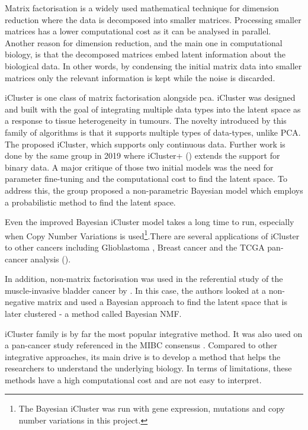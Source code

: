 Matrix factorisation is a widely used mathematical technique for dimension reduction where the data is decomposed into smaller matrices. Processing smaller matrices has a lower computational cost as it can be analysed in parallel. Another reason for dimension reduction, and the main one in computational biology, is that the decomposed matrices embed latent information about the biological data. In other words, by condensing the initial matrix data into smaller matrices only the relevant information is kept while the noise is discarded. 

iCluster \cite{Shen2009-ew, Mo2013-zi, Mo2018-el} is one class of matrix factorisation alongside \acrlong{pca}. iCluster was designed and built with the goal of integrating multiple data types into the latent space as a response to tissue heterogeneity in tumours. The novelty introduced by this family of algorithms is that it supports multiple types of data-types, unlike PCA. The \citet{Shen2009-ew} proposed iCluster, which supports only continuous data. Further work is done by the same group in 2019  where iCluster+ (\citet{Mo2013-zi}) extends the support for binary data. A major critique of those two initial models was the need for parameter fine-tuning and the computational cost to find the latent space. To address this, the group proposed a non-parametric Bayesian model \citet{Mo2018-el} which employs a probabilistic method to find the latent space. 

Even the improved Bayesian iCluster model takes a long time to run, especially when Copy Number Variations is used\footnote{The Bayesian iCluster was run with gene expression, mutations and copy number variations in this project.}.There are several applications of iCluster to other cancers including Glioblastoma \cite{Shen2012-yj},  Breast cancer \citet{Curtis2012-ff} and the TCGA pan-cancer analysis (\citet{Hoadley2018-qe}).

In addition, non-matrix factorisation was used in the referential study of the muscle-invasive bladder cancer by \citet{Robertson2017-mg}. In this case, the authors looked at a non-negative matrix and used a Bayesian approach to find the latent space that is later clustered - a method called Bayesian NMF.

iCluster family is by far the most popular integrative method. It was also used on a pan-cancer \cite{Hoadley2018-qe} study referenced in the MIBC consensus \citet{Kamoun2020-tj}. Compared to other integrative approaches, its main drive is to develop a method that helps the researchers to understand the underlying biology. In terms of limitations, these methods have a high computational cost and are not easy to interpret.

